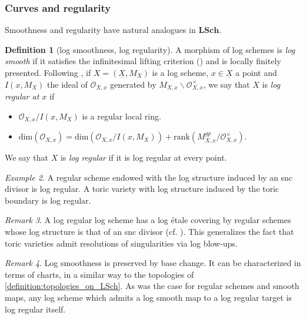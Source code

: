 \documentclass[a4paper,11pt]{amsart} %
\numberwithin{equation}{subsection}
\newcommand{\bd}[1]{{\mathbf{#1}}}
\newcommand{\ul}[1]{{\underline{#1}}}
\newcommand{\cat}[1]{\bd{#1}}
\theoremstyle{definition}
\newtheorem{definition}{Definition}[section]
\theoremstyle{plain}%
\theoremstyle{remark}
\newtheorem{remark}[definition]{Remark}
\newtheorem{example}[definition]{Example}
\begin{document}
\subsubsection{Curves and regularity}
Smoothness and regularity have natural analogues in $\cat{LSch}$.
\begin{definition}[log smoothness, log regularity]
A morphism of log schemes is \emph{log smooth} if it satisfies the infinitesimal lifting criterion (\cite[\S 3.3]{Kato}) and is locally finitely presented. Following \cite[Definition 2.1]{KatoToric}, if $X=(\underline{X},M_X)$ is a log scheme, $x\in\ul X$ a point and $I(x,M_X)$ the ideal of $\mathcal{O}_{X,x}$ generated by $M_{X,x} \backslash \mathcal{O}_{X,x}^{\times}$, we say that $X$ is \emph{log regular at $x$} if
\begin{itemize}
    \item $\mathcal{O}_{X,x}/I(x, M_X)$ is a regular local ring.
    \item $\mathrm{dim} (\mathcal{O}_{X,x}) = \mathrm{dim} (\mathcal{O}_{X,x}/I(x, M_X)) + \mathrm{rank}(M_{X,x}^{gp}/\mathcal{O}_{X,x}^{\times})$.
\end{itemize}
We say that $X$ is \emph{log regular} if it is log regular at every point.
\end{definition}

\begin{example}
 A regular scheme endowed with the log structure induced by an snc divisor is log regular. A toric variety with log structure induced by the toric boundary is log regular.
\end{example}

\begin{remark}
     A log regular log scheme has a log \'etale covering by regular schemes whose log structure is that of an snc divisor (cf. \cite[\S 5.2]{Niziol}). This generalizes the fact that toric varieties admit resolutions of singularities via log blow-ups.
\end{remark}

\begin{remark}
    Log smoothness is preserved by base change. It can be characterized in terms of charts, in a similar way to the topologies of \ref{definition:topologies_on_LSch}. As was the case for regular schemes and smooth maps, any log scheme which admits a log smooth map to a log regular target is log regular itself.
\end{remark}
\end{document}
